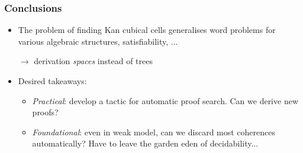 \documentclass[xetex, mathserif, serif]{beamer}
\begin{document}
\begin{frame}
  \frametitle{Conclusions}

  \begin{itemize}
  \item The problem of finding Kan cubical cells generalises word problems for various algebraic structures,
    satisfiability, ...

    $\to$ derivation \emph{spaces} instead of trees
  \item Desired takeaways:
    \begin{itemize}
    \item \emph{Practical}: develop a tactic for automatic proof search. Can we derive new proofs?
    \item \emph{Foundational}: even in weak model, can we discard most coherences
      automatically? Have to leave the garden eden of decidability...
    \end{itemize}
  \end{itemize}

\end{frame}


\end{document}
